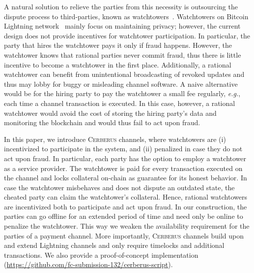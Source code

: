 \documentclass[twocolumn,showpacs,%
  nofootinbib,aps,superscriptaddress,%
  eqsecnum,prd,notitlepage,showkeys,10pt]{revtex4-1}
\newcommand{\eg}{{\em e.g.}}
\newcommand{\sys}{\textsc{Cerberus}\xspace}
\begin{document}
A natural solution to relieve the parties from this necessity is outsourcing the dispute process to third-parties, known as watchtowers~\cite{watchtowers,dryja2016monitors}.
Watchtowers on Bitcoin Lightning network~\cite{poon2015lightning} mainly focus on maintaining privacy; however, the current design does not provide incentives for watchtower participation.
In particular, the party that hires the watchtower pays it only if fraud happens. However, the watchtower knows that rational parties never commit fraud, thus there is little incentive to become a watchtower in the first place. Additionally, a rational watchtower can benefit from unintentional broadcasting of revoked updates and thus may lobby for buggy or misleading channel software. A naive alternative would be for the hiring party to pay the watchtower a small fee regularly, \eg, each time a channel transaction is executed. In this case, however, a rational watchtower would avoid the cost of storing the hiring party's data and monitoring the blockchain and would thus fail to act upon fraud.

In this paper, we introduce \sys channels, where watchtowers are (i) incentivized to participate in the system, and (ii) penalized in case they do not act upon fraud.
In particular,
each party has the option to employ a watchtower as a service provider. The watchtower  is paid for every transaction executed on the channel and locks collateral on-chain as guarantee for its honest behavior. In case the watchtower misbehaves and does not dispute an outdated state, the cheated party can claim the watchtower's collateral.
Hence, rational watchtowers are incentivized both to participate and act upon fraud.
In our construction, the parties can go offline for an extended period of time and need only be online to penalize the watchtower.
This way we weaken the availability requirement for the parties of a payment channel.
More importantly, \sys channels build upon and extend Lightning channels and only require timelocks and additional transactions.%
We also provide a proof-of-concept implementation (\url{https://github.com/fc-submission-132/cerberus-script}).
\end{document}
